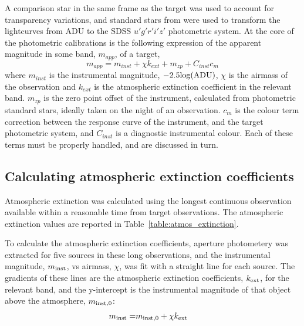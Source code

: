 A comparison star in the same frame as the target was used to account for transparency variations, and standard stars from \citet{smith2002} were used to transform the lightcurves from ADU to the SDSS $u'g'r'i'z'$ photometric system. At the core of the photometric calibrations is the following expression of the apparent magnitude in some band, $m_{app}$, of a target,
\begin{equation}
    \label{eqn:observations:instrumental magnitude from scratch}
    m_{app} = m_{inst} + \chi k_{ext} + m_{zp} + C_{inst}c_{m}
\end{equation}
where $m_{inst}$ is the instrumental magnitude, $-2.5 \rm log(ADU)$, $\chi$ is the airmass of the observation and $k_{ext}$ is the atmospheric extinction coefficient in the relevant band. $m_{zp}$ is the zero point offset of the instrument, calculated from photometric standard stars, ideally taken on the night of an observation. $c_{m}$ is the colour term correction between the response curve of the instrument, and the target photometric system, and $C_{inst}$ is a diagnostic instrumental colour. Each of these terms must be properly handled, and are discussed in turn. 


\subsection{Calculating atmospheric extinction coefficients}
\label{sect:calcualting atmospheric extinction}

Atmospheric extinction was calculated using the longest continuous observation available within a reasonable time from target observations.
The atmospheric extinction values are reported in Table~\ref{table:atmos_extinction}.

To calculate the atmospheric extinction coefficients, aperture photometery was extracted for five sources in these long observations, and the instrumental magnitude, $m_{\rm inst}$, vs airmass, $\chi$, was fit with a straight line for each source. 
The gradients of these lines are the atmospheric extinction coefficients, $k_{\rm ext}$, for the relevant band, and the y-intercept is the instrumental magnitude of that object above the atmosphere, $m_{\rm inst,0}$:
\begin{align*}
    m_{\rm inst} =& m_{\rm inst,0} + \chi k_{\rm ext} 
\end{align*}

